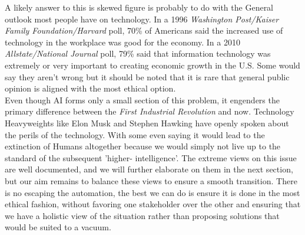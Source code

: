	A likely answer to this is skewed figure is probably to do with the General outlook most people have on technology. In a 1996 \textit{Washington Post/Kaiser Family Foundation/Harvard} poll, 70\% of Americans said the increased use of technology in the workplace was good for the economy. In a 2010 \textit{Allstate/National Journal} poll, 79\% said that information technology was extremely or very important to creating economic growth in the U.S. Some would say they aren't wrong but it should be noted that it is rare that general public opinion is aligned with the most ethical option.\\
	Even though AI forms only a small section of this problem, it engenders the primary difference between the \textit{First Industrial Revolution} and now. Technology Heavyweights like Elon Musk and Stephen Hawking have openly spoken about the perils of the technology. With some even saying it would lead to the extinction of Humans altogether because we would simply not live up to the standard of the subsequent 'higher- intelligence'. The extreme views on this issue are well documented, and we will further elaborate on them in the next section, but our aim remains to balance these views to ensure a smooth transition. There is no escaping the automation, the best we can do is ensure it is done in the most ethical fashion, without favoring one stakeholder over the other and ensuring that we have a holistic view of the situation rather than proposing solutions that would be suited to a vacuum.

